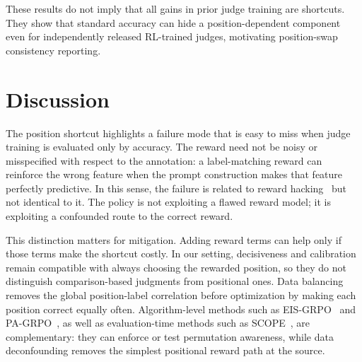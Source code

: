 \documentclass[letterpaper]{article}
\begin{document}
These results do not imply that all gains in prior judge training are shortcuts. They show that standard accuracy can hide a position-dependent component even for independently released RL-trained judges, motivating position-swap consistency reporting.

\begin{table}[t]
\centering
\scriptsize
\setlength{\tabcolsep}{2.5pt}
\caption{External check on public RL-trained judges. Both checkpoints show an original/swap accuracy gap and positive first-position bias among inconsistent predictions.}
\label{tab:judgelrm}
\end{table}

\section{Discussion}
\label{sec:discussion}

The position shortcut highlights a failure mode that is easy to miss when judge training is evaluated only by accuracy. The reward need not be noisy or misspecified with respect to the annotation: a label-matching reward can reinforce the wrong feature when the prompt construction makes that feature perfectly predictive. In this sense, the failure is related to reward hacking~\citep{skalse2022defining,gao2023scaling} but not identical to it. The policy is not exploiting a flawed reward model; it is exploiting a confounded route to the correct reward.

This distinction matters for mitigation. Adding reward terms can help only if those terms make the shortcut costly. In our setting, decisiveness and calibration remain compatible with always choosing the rewarded position, so they do not distinguish comparison-based judgments from positional ones. Data balancing removes the global position-label correlation before optimization by making each position correct equally often. Algorithm-level methods such as EIS-GRPO~\citep{eisgrpo2026} and PA-GRPO~\citep{pagrpo2026}, as well as evaluation-time methods such as SCOPE~\citep{scope2026}, are complementary: they can enforce or test permutation awareness, while data deconfounding removes the simplest positional reward path at the source.
\end{document}
